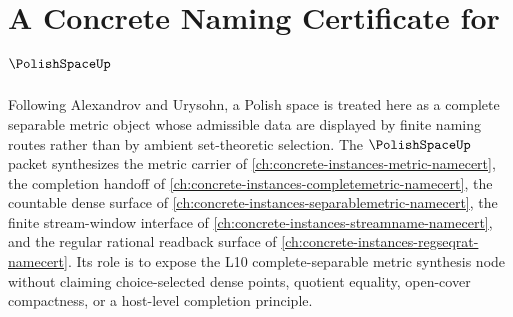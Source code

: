 \chapter{A Concrete Naming Certificate for $\PolishSpaceUp$}
\label{ch:concrete-instances-polishspace-namecert}

Following Alexandrov and Urysohn, a Polish space is treated here as a complete
separable metric object whose admissible data are displayed by finite naming
routes rather than by ambient set-theoretic selection. The
$\PolishSpaceUp$ packet synthesizes the metric carrier of
\autoref{ch:concrete-instances-metric-namecert}, the completion handoff of
\autoref{ch:concrete-instances-completemetric-namecert}, the countable dense
surface of \autoref{ch:concrete-instances-separablemetric-namecert}, the
finite stream-window interface of
\autoref{ch:concrete-instances-streamname-namecert}, and the regular rational
readback surface of \autoref{ch:concrete-instances-regseqrat-namecert}. Its
role is to expose the L10 complete-separable metric synthesis node without
claiming choice-selected dense points, quotient equality, open-cover
compactness, or a host-level completion principle.

